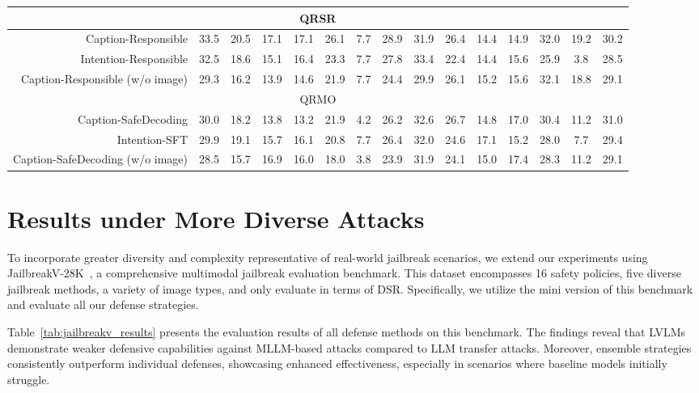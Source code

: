 \begin{table*}[!ht]
{\begin{tabular}{r|ccccccc|ccccccc}
        \midrule
        \midrule
        \multicolumn{15}{c}{QR\textbar{}SR} \\
        \midrule   
        Caption-Responsible & 33.5 & 20.5 & 17.1 & 17.1 & 26.1 & 7.7 & 28.9 & 31.9 & 26.4 & 14.4 & 14.9 &32.0 & 19.2 & 30.2 \\
        Intention-Responsible & 32.5 & 18.6 & 15.1 & 16.4 & 23.3 & 7.7 & 27.8 & 33.4 & 22.4 & 14.4 & 15.6 & 25.9 & 3.8 & 28.5 \\
        Caption-Responsible (w/o image) & 29.3 & 16.2 & 13.9 & 14.6 & 21.9 & 7.7 & 24.4 & 29.9 & 26.1 & 15.2 & 15.6 & 32.1 & 18.8 & 29.1\\
        \midrule
        \multicolumn{15}{c}{QR\textbar{}MO} \\
        \midrule
        Caption-SafeDecoding & 30.0 & 18.2 & 13.8 & 13.2 & 21.9 & 4.2 & 26.2 & 32.6 & 26.7 & 14.8 & 17.0 & 30.4 & 11.2 & 31.0 \\
        Intention-SFT & 29.9 & 19.1 & 15.7 & 16.1 & 20.8 & 7.7 & 26.4 & 32.0 & 24.6 & 17.1 & 15.2 & 28.0 & 7.7 & 29.4\\
        Caption-SafeDecoding (w/o image) & 28.5 & 15.7 & 16.9 & 16.0 & 18.0 & 3.8 & 23.9 & 31.9 & 24.1 & 15.0 & 17.4 & 28.3 & 11.2 & 29.1\\
        \bottomrule
    \end{tabular}}
\end{table*}


\section{Results under More Diverse Attacks}
\label{sec:diverse_attacks}
To incorporate greater diversity and complexity representative of real-world jailbreak scenarios, we extend our experiments using JailbreakV-28K~\cite{luo2024jailbreakv28k}, a comprehensive multimodal jailbreak evaluation benchmark. This dataset encompasses 16 safety policies, five diverse jailbreak methods, a variety of image types, and only evaluate in terms of DSR. Specifically, we utilize the mini version of this benchmark and evaluate all our defense strategies.

Table~\ref{tab:jailbreakv_results} presents the evaluation results of all defense methods on this benchmark. The findings reveal that LVLMs demonstrate weaker defensive capabilities against MLLM-based attacks compared to LLM transfer attacks. Moreover, ensemble strategies consistently outperform individual defenses, showcasing enhanced effectiveness, especially in scenarios where baseline models initially struggle.

